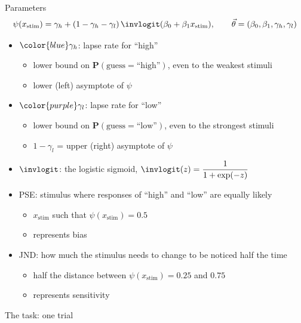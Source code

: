 \begin{frame}{Parameters}
  \[
    \psi(x_\text{stim}) = \gamma_h + (1-\gamma_h-\gamma_l)\,
                          \invlogit(\beta_0 + \beta_1 x_\text{stim}),
    \qquad \vec{\theta} = (\beta_0, \beta_1, \gamma_h, \gamma_l)
  \]
  \begin{itemize}
    \item ${\color{blue}\gamma_h}$: lapse rate for ``high''
    \begin{itemize}
      \item lower bound on $\mathbf{P}(\text{guess} = \text{``high''})$, even to the weakest stimuli
      \item lower (left) asymptote of $\psi$
    \end{itemize}
    \item ${\color{purple}\gamma_l}$: lapse rate for ``low''
    \begin{itemize}
      \item lower bound on $\mathbf{P}(\text{guess} = \text{``low''})$, even to the strongest stimuli
      \item $1-\gamma_l$ = upper (right) asymptote of $\psi$
    \end{itemize}
    \item $\invlogit$: the logistic sigmoid, $\invlogit(z) = \dfrac{1}{1+\exp(-z)}$
    \item PSE: stimulus where responses of ``high'' and ``low'' are equally likely
    \begin{itemize}
      \item $x_\text{stim}$ such that $\psi(x_\text{stim}) = 0.5$
      \item represents bias
    \end{itemize}
    \item JND: how much the stimulus needs to change to be noticed half the time
    \begin{itemize}
      \item half the distance between $\psi(x_\text{stim}) = 0.25$ and $0.75$
      \item represents sensitivity
    \end{itemize}
  \end{itemize}
\end{frame}

\begin{frame}{The task: one trial}
  \centering
\end{frame}

